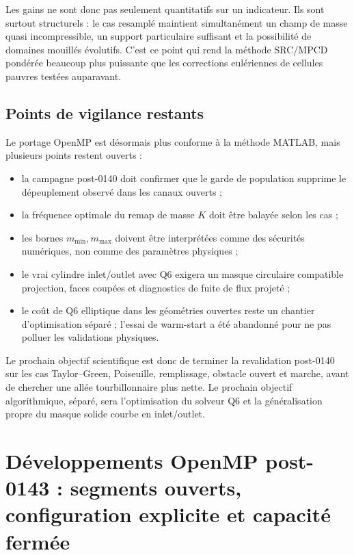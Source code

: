 \documentclass[11pt,a4paper]{article}
\begin{document}
Les gains ne sont donc pas seulement quantitatifs sur un indicateur. Ils sont surtout structurels : le cas resamplé maintient simultanément un champ de masse quasi incompressible, un support particulaire suffisant et la possibilité de domaines mouillés évolutifs. C'est ce point qui rend la méthode SRC/MPCD pondérée beaucoup plus puissante que les corrections eulériennes de cellules pauvres testées auparavant.

\subsection{Points de vigilance restants}

Le portage OpenMP est désormais plus conforme à la méthode MATLAB, mais plusieurs points restent ouverts :
\begin{itemize}
  \item la campagne post-0140 doit confirmer que le garde de population supprime le dépeuplement observé dans les canaux ouverts ;
  \item la fréquence optimale du remap de masse $K$ doit être balayée selon les cas ;
  \item les bornes $m_{\min},m_{\max}$ doivent être interprétées comme des sécurités numériques, non comme des paramètres physiques ;
  \item le vrai cylindre inlet/outlet avec Q6 exigera un masque circulaire compatible projection, faces coupées et diagnostics de fuite de flux projeté ;
  \item le coût de Q6 elliptique dans les géométries ouvertes reste un chantier d'optimisation séparé ; l'essai de warm-start a été abandonné pour ne pas polluer les validations physiques.
\end{itemize}

Le prochain objectif scientifique est donc de terminer la revalidation post-0140 sur les cas Taylor--Green, Poiseuille, remplissage, obstacle ouvert et marche, avant de chercher une allée tourbillonnaire plus nette. Le prochain objectif algorithmique, séparé, sera l'optimisation du solveur Q6 et la généralisation propre du masque solide courbe en inlet/outlet.




\section{Développements OpenMP post-0143 : segments ouverts, configuration explicite et capacité fermée}
\end{document}
